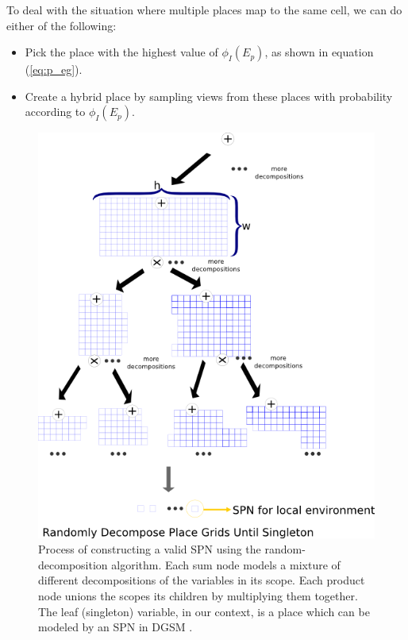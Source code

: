 \documentclass[10pt, titlepage]{article}
\theoremstyle{definition}
\begin{document}
To deal with the situation where multiple places map to the same cell, we can do either of the following:
\begin{itemize}
\item Pick the place with the highest value of $\phi_I(E_p)$, as shown in equation (\ref{eq:p_eg}). 
\item Create a hybrid place by sampling views from these places with probability according to $\phi_I(E_p)$.
\end{itemize}

\begin{figure}[!htb]
    \centering
    \captionsetup{width=.8\linewidth}
    \includegraphics[scale=0.6]{images/spn_grid.png}
    \caption{Process of constructing a valid SPN using the random-decomposition algorithm. Each sum node models a mixture of different decompositions of the variables in its scope. Each product node unions the scopes its children by multiplying them together. The leaf (singleton) variable, in our context, is a place which can be modeled by an SPN in DGSM \cite{pronobis2016learning}.}
    \label{fig:grid_learn}
\end{figure}
\end{document}

